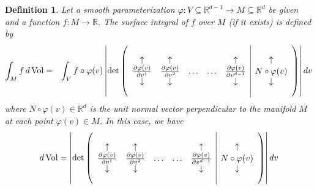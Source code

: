 \documentclass{article}
\renewcommand\det{\operatorname{det}}
\newcommand{\p}{\partial}
\newcommand{\R}{\mathbb{R}}
\newcommand{\f}[2]{\frac{#1}{#2}}
\theoremstyle{theorem}
\newtheorem{definition}[theorem]{Definition}
\newcommand{\Vol}{\operatorname{Vol}}
\begin{document}
\begin{definition}
Let a smooth parameterization $\varphi: V \subseteq \R^{d-1} \to M \subseteq \R^d$ be given and a function $f: M\to \R$. The surface integral of $f$ over $M$ (if it exists) is defined by 
\begin{eqnarray*}
    \int_M f\,d\Vol &=& \int_V f\circ \varphi(v) \, \abs{ \det\left(\begin{array}{ccccc|c}
     & & & & &\\
    \uparrow &\uparrow & & & \uparrow &\uparrow \\ 
    \f{\p \varphi(v)}{\p v^1}& \f{\p \varphi(v)}{\p v^2} & \dots &\dots&\f{\p \varphi(v)}{\p v^{d-1}}& N\circ \varphi(v) \\
    \downarrow  &\downarrow  & & & \downarrow  &\downarrow \\ 
    &&&& & 
    \end{array}\right)
    } \,dv
\end{eqnarray*}
where $N\circ \varphi(v)\in \R^d$ is the unit normal vector perpendicular to the manifold $M$ at each point $\varphi(v)\in M$. In this case, we have
\begin{equation*}
    d\Vol = \abs{ \det\left(\begin{array}{ccccc|c}
     & & & & &\\
    \uparrow &\uparrow & & & \uparrow &\uparrow \\ 
    \f{\p \varphi(v)}{\p v^1}& \f{\p \varphi(v)}{\p v^2} & \dots &\dots&\f{\p \varphi(v)}{\p v^{d-1}}& N\circ \varphi(v) \\
    \downarrow  &\downarrow  & & & \downarrow  &\downarrow \\ 
    &&&& & 
    \end{array}\right)
    } \,dv
\end{equation*}
\end{definition}
\end{document}
